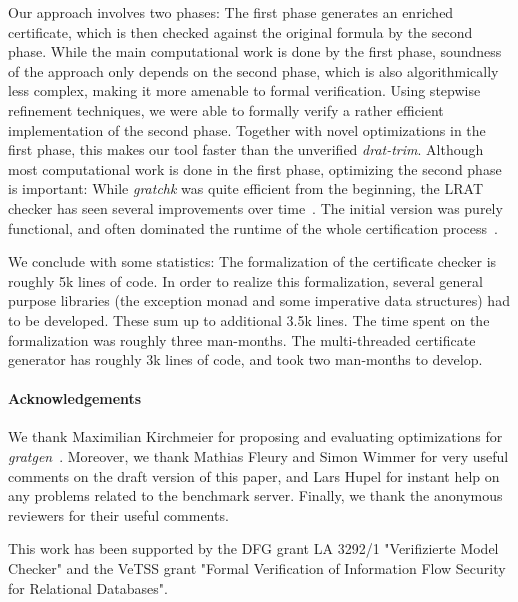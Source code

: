 \documentclass[smallcondensed]{svjour3}     %
\begin{document}
Our approach involves two phases: The first phase generates an enriched certificate, 
which is then checked against the original formula by the second phase.
While the main computational work is done by the first phase, soundness of the approach 
only depends on the second phase, which is also algorithmically less complex, making it more amenable to formal verification. 
Using stepwise refinement techniques, we were able to formally verify a rather efficient implementation of the second phase.
Together with novel optimizations in the first phase, this makes our tool faster than the unverified {\sl drat-trim}.
Although most computational work is done in the first phase, optimizing the second phase is important: 
While {\sl gratchk} was quite efficient from the beginning, the LRAT checker has seen several 
improvements over time~\cite{HHKW17}. The initial version was purely functional, and often dominated the runtime of the whole certification 
process~\cite{CHHKS17}. 

% 
% 
% 
% 
% 
% 
% 


We conclude with some statistics: The formalization of the certificate checker is roughly 5k lines of code.
In order to realize this formalization, several general purpose libraries (\eg the exception monad and some imperative data structures) had to be developed. 
These sum up to additional 3.5k lines. The time spent on the formalization was roughly three man-months. The multi-threaded certificate generator has roughly 3k 
lines of code, and took two man-months to develop.

\paragraph{Acknowledgements} We thank Maximilian Kirchmeier for proposing and evaluating optimizations for {\sl gratgen}~\cite{Kirch17}.
Moreover, we thank Mathias Fleury and Simon Wimmer for very useful comments on the draft version of this paper, 
and Lars Hupel for instant help on any problems related to the benchmark server. Finally, we thank the anonymous reviewers for their useful comments.

This work has been supported by the DFG grant LA 3292/1 "Verifizierte Model Checker" 
and the VeTSS grant "Formal Verification of Information Flow Security for Relational Databases".




\end{document}

